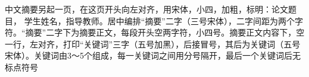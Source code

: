 \begin{chabstract}
中文摘要另起一页，在这页开头向左对齐，用宋体，小四，加粗，标明：论文题目， 学生姓名，指导教师。居中编排“摘要”二字（三号宋体），二字间距为两个字符。“摘要”二字下为摘要正文，每段开头空两字符，小四号。摘要正文内容下，空一行，左对齐，打印“关键词”三字（五号加黑），后接冒号，其后为关键词（五号宋体）。关键词由3～5个组成，每一关键词之间用分号隔开，最后一个关键词后无标点符号
\end{chabstract}
